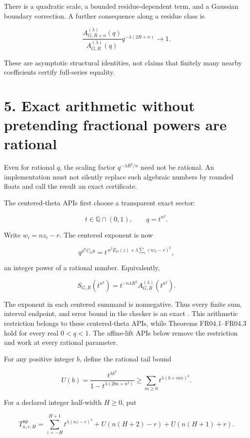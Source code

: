 \documentclass[
  11pt,
  a4paper,
]{report}
\let\singularitytexttt\texttt
\renewcommand{\texttt}[1]{\singularitytexttt{\seqsplit{#1}}}
\begin{document}
There is a quadratic scale, a bounded residue-dependent term, and a
Gaussian boundary correction. A further consequence along a residue
class is

\[
 \frac{A_{G,R+n}^{(\lambda)}(q)}{A_{G,R}^{(\lambda)}(q)}
 q^{-\lambda(2R+n)}\longrightarrow1.
 \tag{10}
\]

These are asymptotic structural identities, not claims that finitely
many nearby coefficients certify full-series equality.

\hypertarget{exact-arithmetic-without-pretending-fractional-powers-are-rational}{%
\section{5. Exact arithmetic without pretending fractional powers are
rational}\label{exact-arithmetic-without-pretending-fractional-powers-are-rational}}

Even for rational \(q\), the scaling factor \(q^{-\lambda R^2/n}\) need
not be rational. An implementation must not silently replace such
algebraic numbers by rounded floats and call the result an exact
certificate.

The centered-theta APIs first choose a transparent exact sector:

\[
 t\in\mathbb Q\cap(0,1),\qquad q=t^{n^2}.
 \tag{11}
\]

Write \(w_i=nz_i-r\). The centered exponent is now

\[
 q^{y^{\mathsf T}C_Gy}
 =t^{\,n^2E_G(z)+\lambda\sum_i(nz_i-r)^2},
 \tag{12}
\]

an integer power of a rational number. Equivalently,

\[
 S_{G,R}(t^{n^2})
 =t^{-n\lambda R^2}A_{G,R}^{(\lambda)}(t^{n^2}).
\]

The exponent in each centered summand is nonnegative. Thus every finite
sum, interval endpoint, and error bound in the checker is an exact
\texttt{Fraction}. This arithmetic restriction belongs to these
centered-theta APIs, while Theorems FR04.1--FR04.3 hold for every real
\(0<q<1\). The affine-lift APIs below remove the restriction and work at
every rational parameter.

For any positive integer \(b\), define the rational tail bound

\[
 U(b)=\frac{t^{\lambda b^2}}
 {1-t^{\lambda(2bn+n^2)}}
 \ge\sum_{m\ge0}t^{\lambda(b+nm)^2}.
 \tag{13}
\]

For a declared integer half-width \(H\ge0\), put

\[
 T^{\mathrm{up}}_{n,r,H}
 =\sum_{z=-H}^{H+1}t^{\lambda(nz-r)^2}
 +U(n(H+2)-r)+U(n(H+1)+r).
 \tag{14}
\]
\end{document}
